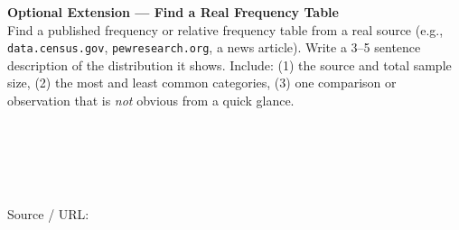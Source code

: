 \documentclass[10pt]{article}
\begin{document}
\begin{extensionbox}
\small
\textbf{Optional Extension --- Find a Real Frequency Table}\\[4pt]
Find a published frequency or relative frequency table from a real source
(e.g., \texttt{data.census.gov}, \texttt{pewresearch.org}, a news article).
Write a 3--5 sentence description of the distribution it shows. Include:
(1) the source and total sample size, (2) the most and least common categories,
(3) one comparison or observation that is \textit{not} obvious from a quick glance.

\vspace{8pt}
\writeline\\[1pt]\writeline\\[1pt]\writeline\\[1pt]\writeline\\[1pt]\writeline

\vspace{4pt}
\textcolor{slate}{\scriptsize Source / URL:\;\blank{11cm}}
\end{extensionbox}
\end{document}
